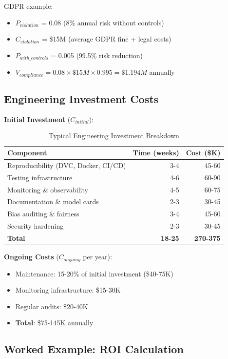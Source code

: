 GDPR example:
\begin{itemize}
    \item $P_{violation}$ = 0.08 (8\% annual risk without controls)
    \item $C_{violation}$ = \$15M (average GDPR fine + legal costs)
    \item $P_{with\_controls}$ = 0.005 (99.5\% risk reduction)
    \item $V_{compliance} = 0.08 \times \$15M \times 0.995 = \$1.194M$ annually
\end{itemize}

\subsection{Engineering Investment Costs}

\textbf{Initial Investment} ($C_{initial}$):

\begin{table}[h]
\centering
\caption{Typical Engineering Investment Breakdown}
\begin{tabular}{lrr}
\toprule
\textbf{Component} & \textbf{Time (weeks)} & \textbf{Cost (\$K)} \\
\midrule
Reproducibility (DVC, Docker, CI/CD) & 3-4 & 45-60 \\
Testing infrastructure & 4-6 & 60-90 \\
Monitoring \& observability & 4-5 & 60-75 \\
Documentation \& model cards & 2-3 & 30-45 \\
Bias auditing \& fairness & 3-4 & 45-60 \\
Security hardening & 2-3 & 30-45 \\
\midrule
\textbf{Total} & \textbf{18-25} & \textbf{270-375} \\
\bottomrule
\end{tabular}
\end{table}

\textbf{Ongoing Costs} ($C_{ongoing}$ per year):
\begin{itemize}
    \item Maintenance: 15-20\% of initial investment (\$40-75K)
    \item Monitoring infrastructure: \$15-30K
    \item Regular audits: \$20-40K
    \item \textbf{Total}: \$75-145K annually
\end{itemize}

\subsection{Worked Example: ROI Calculation}

